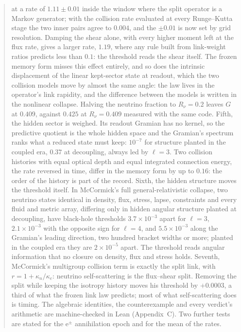 \documentclass[11pt]{article}
\begin{document}
\begin{abstract}
at a rate of $1.11\pm0.01$ inside the window where the split operator is a Markov generator; with the collision rate evaluated at every Runge--Kutta stage the two inner pairs agree to $0.004$, and the $\pm0.01$ is now set by grid resolution. Damping the shear alone, with every higher moment left at the flux rate, gives a larger rate, $1.19$, where any rule built from link-weight ratios predicts less than $0.1$: the threshold reads the shear itself. The frozen memory form misses this effect entirely, and so does the intrinsic displacement of the linear kept-sector state at readout, which the two collision models move by almost the same angle: the law lives in the operator's link rapidity, and the difference between the models is written in the nonlinear collapse. Halving the neutrino fraction to $R_\nu=0.2$ leaves $G$ at $0.409$, against $0.425$ at $R_\nu=0.409$ measured with the same code. Fifth, the hidden sector is weighed. Its readout Gramian has no kernel, so the predictive quotient is the whole hidden space and the Gramian's spectrum ranks what a reduced state must keep: $10^{-7}$ for structure planted in the coupled era, $0.37$ at decoupling, always led by $\ell=3$. Two collision histories with equal optical depth and equal integrated connection energy, the rate reversed in time, differ in the memory form by up to $0.16$: the order of the history is part of the record. Sixth, the hidden structure moves the threshold itself. In McCormick's full general-relativistic collapse, two neutrino states identical in density, flux, stress, lapse, constraints and every fluid and metric array, differing only in hidden angular structure planted at decoupling, have black-hole thresholds $3.7\times10^{-3}$ apart for $\ell=3$, $2.1\times10^{-3}$ with the opposite sign for $\ell=4$, and $5.5\times10^{-3}$ along the Gramian's leading direction, two hundred bracket widths or more; planted in the coupled era they are $2\times10^{-5}$ apart. The threshold reads angular information that no closure on density, flux and stress holds. Seventh, McCormick's multigroup collision term is exactly the split link, with $r=1+\kappa_n/\kappa_e$: neutrino self-scattering is the flux--shear split. Removing the split while keeping the isotropy history moves his threshold by $+0.0003$, a third of what the frozen link law predicts; most of what self-scattering does is timing. The algebraic identities, the counterexample and every verdict's arithmetic are machine-checked in Lean (Appendix~C). Two further tests are stated for the e$^\pm$ annihilation epoch and for the mean of the rates.
\end{abstract}
\end{document}
